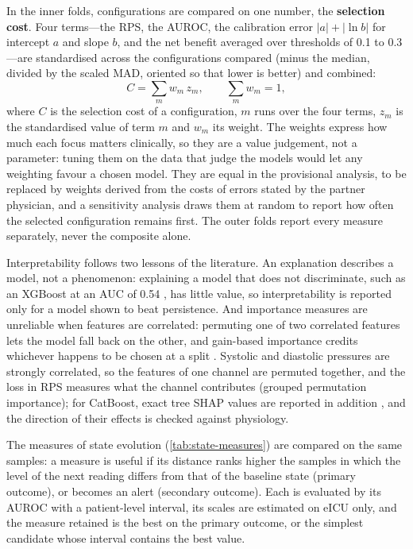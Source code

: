 \documentclass[11pt,a4paper,oneside]{report}
\begin{document}
In the inner folds, configurations are compared on one number, the \textbf{selection cost}. Four terms---the RPS, the AUROC, the calibration error $\lvert a\rvert + \lvert \ln b\rvert$ for intercept $a$ and slope $b$, and the net benefit averaged over thresholds of 0.1 to 0.3---are standardised across the configurations compared (minus the median, divided by the scaled MAD, oriented so that lower is better) and combined:
\begin{equation}
  C = \sum_m w_m\, z_m, \qquad \textstyle\sum_m w_m = 1 ,
\end{equation}
where $C$ is the selection cost of a configuration, $m$ runs over the four terms, $z_m$ is the standardised value of term $m$ and $w_m$ its weight. The weights express how much each focus matters clinically, so they are a value judgement, not a parameter: tuning them on the data that judge the models would let any weighting favour a chosen model. They are equal in the provisional analysis, to be replaced by weights derived from the costs of errors stated by the partner physician, and a sensitivity analysis draws them at random to report how often the selected configuration remains first. The outer folds report every measure separately, never the composite alone. 

Interpretability follows two lessons of the literature. An explanation describes a model, not a phenomenon: explaining a model that does not discriminate, such as an XGBoost at an AUC of 0.54 \parencite{mendoza2025}, has little value, so interpretability is reported only for a model shown to beat persistence. And importance measures are unreliable when features are correlated: permuting one of two correlated features lets the model fall back on the other, and gain-based importance credits whichever happens to be chosen at a split \parencite{strobl2008,gregorutti2017}. Systolic and diastolic pressures are strongly correlated, so the features of one channel are permuted together, and the loss in RPS measures what the channel contributes (grouped permutation importance); for CatBoost, exact tree SHAP values are reported in addition \parencite{lundberg2017}, and the direction of their effects is checked against physiology.

The measures of state evolution (\cref{tab:state-measures}) are compared on the same samples: a measure is useful if its distance ranks higher the samples in which the level of the next reading differs from that of the baseline state (primary outcome), or becomes an alert (secondary outcome). Each is evaluated by its AUROC with a patient-level interval, its scales are estimated on eICU only, and the measure retained is the best on the primary outcome, or the simplest candidate whose interval contains the best value.
\end{document}
